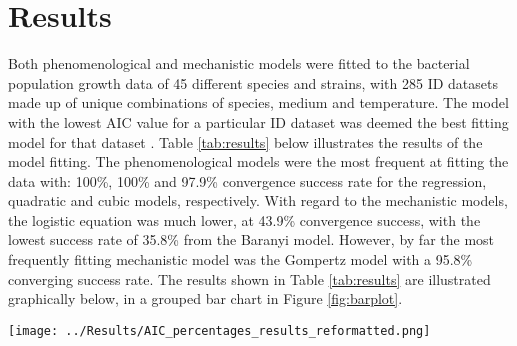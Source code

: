 \documentclass[11pt, a4paper]{article} %
\begin{document}
\section{Results}

Both phenomenological and mechanistic models were fitted to the bacterial population growth data of 45 different species and strains, with 285 ID datasets made up of unique combinations of species, medium and temperature. The model with the lowest AIC value for a particular ID dataset was deemed the best fitting model for that dataset \citep{RN112}. Table \ref{tab:results} below illustrates the results of the model fitting. The phenomenological models were the most frequent at fitting the data with: 100\%, 100\% and 97.9\% convergence success rate for the regression, quadratic and cubic models, respectively. With regard to the mechanistic models, the logistic equation was much lower, at 43.9\% convergence success, with the lowest success rate of 35.8\% from the Baranyi model. However, by far the most frequently fitting mechanistic model was the Gompertz model with a 95.8\% converging success rate. The results shown in Table \ref{tab:results} are illustrated graphically below, in a grouped bar chart in Figure \ref{fig:barplot}.

\begin{table}
\caption{\textbf{A)} The percentage for which the model is the best fitting model across all dataset IDs. \textbf{B)} The percentage for which the model fits all dataset IDs. \textbf{C)} Of the dataset IDs the model fits (B), the percentage for which it fits the dataset IDs the best.}
\label{tab:results}
\end{table}

\begin{SCfigure} %
\centering
\texttt{[image: ../Results/AIC\_percentages\_results\_reformatted.png]}
\caption{\textbf{A)} The percentage for which the model is the best fitting model across all dataset IDs. \textbf{B)} The percentage for which the model fits all dataset IDs. \textbf{C)} Of the dataset IDs the model fits (B), the percentage for which it fits the dataset IDs the best.}
\label{fig:barplot}
\end{SCfigure}
\end{document}
